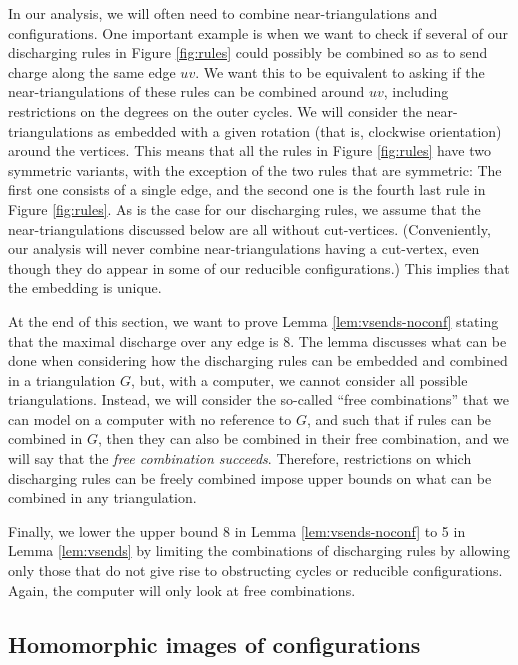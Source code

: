 \documentclass[10pt,a4paper]{article}
\begin{document}
In our analysis, we will often need to combine near-triangulations and configurations. 
One important example is when we want to check if several of our discharging rules in Figure \ref{fig:rules} could
possibly be combined so as to send charge along the same edge $uv$. We want this
to be equivalent to asking if the near-triangulations of these rules can be combined around $uv$, including restrictions on the degrees on the outer cycles. We will consider the near-triangulations as embedded with a given rotation (that is, clockwise orientation) around the vertices. This means that all the rules
in Figure \ref{fig:rules} have two symmetric variants, with the exception of the two rules that are symmetric: The first one consists of a single edge, and the 
second one is the fourth last rule 
in Figure \ref{fig:rules}. As is the case for our discharging rules, we assume that the near-triangulations
discussed below are all without cut-vertices.
(Conveniently, our analysis will never combine near-triangulations having a cut-vertex, even though they do appear in some of our reducible configurations.)
This implies that the embedding is unique.

At the end of this section, we want to prove Lemma \ref{lem:vsends-noconf} stating that the maximal discharge over any edge is $8$. The lemma discusses what can be done when considering how the discharging rules can be embedded and combined in a triangulation $G$, but, with a computer, we cannot consider all possible triangulations. Instead, we will consider the so-called ``free combinations'' that we can model on a computer with no reference to $G$, and such that if rules can be combined in $G$, then they can also be combined in their free combination, and we will say that the \emph{free combination succeeds}.
Therefore, restrictions on which discharging rules can be freely combined impose upper bounds on what can be combined in any triangulation.

Finally, we lower the upper bound 8 in Lemma \ref{lem:vsends-noconf} to 5 in Lemma \ref{lem:vsends} by limiting the combinations of discharging rules by allowing only those that do not give rise to obstructing cycles or reducible configurations. Again, the computer will only look at free combinations. 


\subsection{Homomorphic images of configurations}
\label{sect:embedding}
\end{document}
